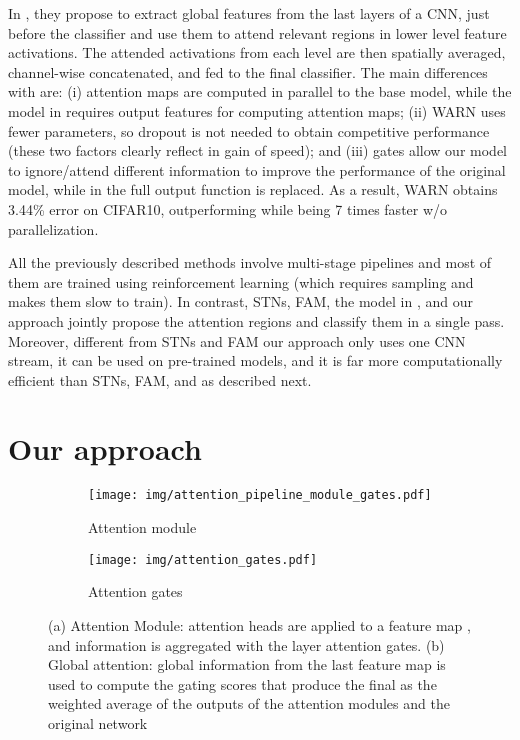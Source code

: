 \documentclass[runningheads]{llncs}
\begin{document}
In \cite{jetley2018learn}, they propose to extract global features from the last layers of a CNN, just before the classifier and use them to attend relevant regions in lower level feature activations. The attended activations from each level are then spatially averaged, channel-wise concatenated, and fed to the final classifier. The main differences with \cite{jetley2018learn} are: (i) attention maps are computed in parallel to the base model, while the model in \cite{jetley2018learn} requires output features for computing attention maps; (ii) WARN uses fewer parameters, so dropout is not needed to obtain competitive performance (these two factors clearly reflect in gain of speed); and (iii) gates allow our model to ignore/attend different information to improve the performance of the original model, while in \cite{jetley2018learn} the full output function is replaced. As a result, WARN obtains 3.44\% error on CIFAR10, outperforming \cite{jetley2018learn} while being 7 times faster w/o parallelization. 

All the previously described methods involve multi-stage pipelines and most of them are trained using reinforcement learning (which requires sampling and makes them slow to train). In contrast, STNs, FAM, the model in \cite{jetley2018learn}, and our approach jointly propose the attention regions and classify them in a single pass. Moreover, different from STNs and FAM our approach only uses one CNN stream, it can be used on pre-trained models, and it is far more computationally efficient than STNs, FAM, and \cite{jetley2018learn} as described next.

\section{Our approach}
\label{sect:approach}

\begin{figure}[t!]
\centering 
\begin{subfigure}{0.55\textwidth}
	\texttt{[image: img/attention\_pipeline\_module\_gates.pdf]}
\caption{Attention module}
\label{fig:attention_module}
\end{subfigure}
\begin{subfigure}{0.4\textwidth}
	\texttt{[image: img/attention\_gates.pdf]}
\caption{Attention gates}
\label{fig:attention_gates}
\end{subfigure}
\caption{(a) Attention Module:  attention heads  are applied to a feature map , and information is aggregated with the layer attention gates. (b) Global attention: global information from the last feature map  is used to compute the gating scores that produce the final  as the weighted average of the outputs of the attention modules and the original network }
\label{fig:modules}
\end{figure}
\end{document}
